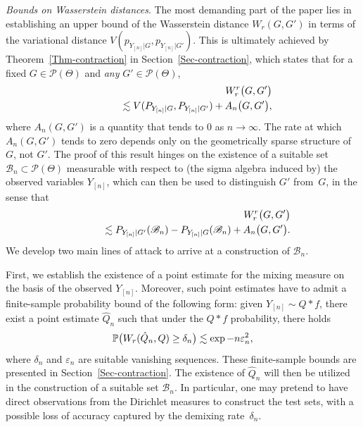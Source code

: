 \documentclass[MSNbibl,number,citesort]{arxbj}
\newcommand{\eqref}[1]{(\ref{#1})}
\newcommand{\Pcal}{\mathscr{P}}
\newcommand{\BB}{\mathscr{B}}
\newcommand{\Prob}{\mathbb{P}}
\newcommand{\Wr}{W_r}
\newcommand{\hatQ}{\hat{Q}}
\newcommand{\PG}{P_{Y_{[n]}|G}}
\newcommand{\YYn}{Y_{[n]}}
\begin{document}
\textit{Bounds on Wasserstein distances}.
The most demanding part of the paper lies in establishing
an upper bound of the Wasserstein distance $\Wr(G,G')$ in terms
of the variational distance $V({p_{Y_{[n]}|G}},
{p_{Y_{[n]}|G'}})$. This is ultimately achieved by
Theorem~\ref{Thm-contraction} in Section~\ref{Sec-contraction},
which states that for a fixed $G\in\Pcal(\Theta)$
and \emph{any} $G'\in\Pcal(\Theta)$,\vspace*{3pt}
%
%
\begin{eqnarray}
\label{Eqn-overview-1}&& \Wr^r \bigl(G,G' \bigr)
\nonumber
\\[-8pt]
\\[-8pt]
\nonumber
&&\qquad \lesssim V(\PG,
P_{Y_{[n]}|G'})
+ A_n \bigl(G,G' \bigr),\vspace*{3pt}
\end{eqnarray}
%
where $A_n(G,G')$ is a quantity that tends to 0 as $n\rightarrow\infty$.
The rate at which $A_n(G,G')$ tends to zero depends only on
the geometrically sparse structure of $G$, not $G'$.
The proof of this result hinges on the existence of
a suitable set $\BB_n \subset\Pcal(\Theta)$ measurable with
respect to (the sigma algebra induced by) the observed variables
$\YYn$, which can then be used to distinguish $G'$ from~$G$,
in the sense that\vspace*{3pt}
%
%
\begin{eqnarray}
\label{Eqn-overview-2} &&\Wr^r \bigl(G,G' \bigr)
\nonumber
\\[-8pt]
\\[-8pt]
\nonumber
&&\qquad \lesssim
P_{Y_{[n]}|G'}( \BB_n) - \PG(\BB_n) + A_n
\bigl(G,G' \bigr).\vspace*{3pt}
\end{eqnarray}
%
We develop two main lines of attack to arrive at a construction of $\BB_n$.

First, we establish the existence of a point estimate for the mixing
measure on the basis of the observed $\YYn$. Moreover, such point
estimates have to admit a finite-sample probability bound of the
following form: given $\YYn\sim Q*f$, there exist a point estimate
$\hatQ_n$ such that under the $Q*f$ probability, there holds\vspace*{3pt}
%
\[
\Prob \bigl(\Wr(\hatQ_n,Q) \geq\delta_n \bigr) \lesssim
\exp-n\varepsilon_n^2,\vspace*{3pt}
\]
%
where $\delta_n$ and $\varepsilon_n$ are suitable vanishing sequences.
These finite-sample bounds are presented in Section~\ref{Sec-contraction}.
The existence of $\hatQ_n$ will then be utilized in the construction
of a suitable set $\BB_n$. In particular, one may pretend to
have direct observations from the Dirichlet measures
to construct the test sets, with a possible loss of accuracy
captured by the demixing rate~$\delta_n$.
\end{document}
